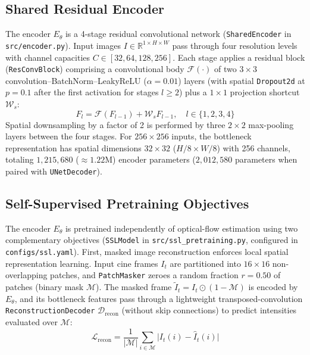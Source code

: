 \documentclass[pdflatex,sn-mathphys]{sn-jnl}
\theoremstyle{thmstyleone}
\theoremstyle{thmstyletwo}
\theoremstyle{thmstylethree}
\begin{document}
\subsection{Shared Residual Encoder}
The encoder $E_\theta$ is a 4-stage residual convolutional network (\texttt{SharedEncoder} in \texttt{src/encoder.py}). Input images $I \in \mathbb{R}^{1 \times H \times W}$ pass through four resolution levels with channel capacities $C \in [32, 64, 128, 256]$. Each stage applies a residual block (\texttt{ResConvBlock}) comprising a convolutional body $\mathcal{F}(\cdot)$ of two $3 \times 3$ convolution--BatchNorm--LeakyReLU ($\alpha=0.01$) layers (with spatial \texttt{Dropout2d} at $p=0.1$ after the first activation for stages $l \ge 2$) plus a $1 \times 1$ projection shortcut $\mathcal{W}_s$:
\begin{equation}
F_{l} = \mathcal{F}(F_{l-1}) + \mathcal{W}_s F_{l-1}, \quad l \in \{1, 2, 3, 4\}
\label{eq:residual}
\end{equation}
Spatial downsampling by a factor of 2 is performed by three $2 \times 2$ max-pooling layers between the four stages. For $256 \times 256$ inputs, the bottleneck representation has spatial dimensions $32 \times 32$ ($H/8 \times W/8$) with 256 channels, totaling $1,215,680$ ($\approx 1.22\text{M}$) encoder parameters ($2,012,580$ parameters when paired with \texttt{UNetDecoder}).

\subsection{Self-Supervised Pretraining Objectives}
The encoder $E_\theta$ is pretrained independently of optical-flow estimation using two complementary objectives (\texttt{SSLModel} in \texttt{src/ssl\_pretraining.py}, configured in \texttt{configs/ssl.yaml}). First, masked image reconstruction enforces local spatial representation learning. Input cine frames $I_t$ are partitioned into $16 \times 16$ non-overlapping patches, and \texttt{PatchMasker} zeroes a random fraction $r = 0.50$ of patches (binary mask $\mathcal{M}$). The masked frame $\tilde{I}_t = I_t \odot (1 - \mathcal{M})$ is encoded by $E_\theta$, and its bottleneck features pass through a lightweight transposed-convolution \texttt{ReconstructionDecoder} $\mathcal{D}_{\text{recon}}$ (without skip connections) to predict intensities evaluated over $\mathcal{M}$:
\begin{equation}
\mathcal{L}_{\text{recon}} = \frac{1}{|\mathcal{M}|} \sum_{i \in \mathcal{M}} \bigl| I_t(i) - \hat{I}_t(i) \bigr|
\label{eq:recon}
\end{equation}
\end{document}
